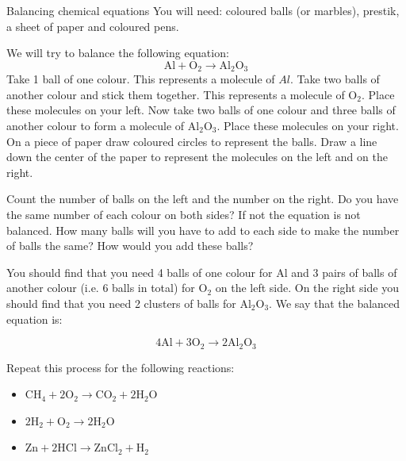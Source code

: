             \begin{activity}{Balancing chemical equations}
            \nopagebreak
            \label{m38726*eip-695}You will need: coloured balls (or marbles), prestik, a sheet of paper and coloured pens.
\par 
\label{m38726*eip-69823}We will try to balance the following equation:
\label{m38726*eid0342}\nopagebreak\noindent{}
    \begin{equation}
    \mathrm{Al}+{\mathrm{O}}_{2}\to {\mathrm{Al}}_{2}{\mathrm{O}}_{3}\tag{13.4}
      \end{equation}
Take 1 ball of one colour. This represents a molecule of $Al$. Take two balls of another colour and stick them together. This represents a molecule of ${\mathrm{O}}_{2}$. Place these molecules on your left. Now take two balls of one colour and three balls of another colour to form a molecule of ${\mathrm{Al}}_{2}{\mathrm{O}}_{3}$. Place these molecules on your right. On a piece of paper draw coloured circles to represent the balls. Draw a line down the center of the paper to represent the molecules on the left and on the right. 
\par 
\label{m38726*id23534}
Count the number of balls on the left and the number on the right. Do you have the same number of each colour on both sides? If not the equation is not balanced. How many balls will you have to add to each side to make the number of balls the same? How would you add these balls?
\par 
\label{m38726*id09873432}You should find that you need 4 balls of one colour for $\mathrm{Al}$ and 3 pairs of balls of another colour (i.e. 6 balls in total) for ${\mathrm{O}}_{2}$ on the left side. On the right side you should find that you need 2 clusters of balls for ${\mathrm{Al}}_{2}{\mathrm{O}}_{3}$.
We say that the balanced equation is:
\label{m38726*id97235}\nopagebreak\noindent{}

    \begin{equation}
    4\mathrm{Al}+3{\mathrm{O}}_{2}\to 2{\mathrm{Al}}_{2}{\mathrm{O}}_{3}\tag{13.5}
      \end{equation}
\par 
\label{m38726*id570943}Repeat this process for the following reactions:
\label{m38726*id08342}\begin{itemize}[noitemsep]
            \item 
${\mathrm{CH}}_{4}+2{\mathrm{O}}_{2}\to {\mathrm{CO}}_{2}+2{\mathrm{H}}_{2}\mathrm{O}$
\item 
$2{\mathrm{H}}_{2}+{\mathrm{O}}_{2}\to 2{\mathrm{H}}_{2}\mathrm{O}$
\item 
$\mathrm{Zn}+2\mathrm{HCl}\to {\mathrm{ZnCl}}_{2}+{\mathrm{H}}_{2}$
\end{itemize}
\end{activity}
\par \label{m38726*uid10}
